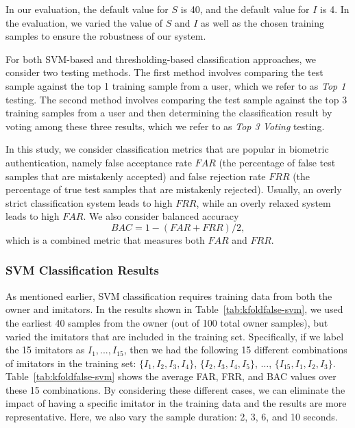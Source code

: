 In our evaluation, the default value for $S$ is 40, and the default value for 
$I$ is 4. In the evaluation, we varied the value of $S$ and $I$ as well as the 
chosen training samples to ensure the robustness of our system.

For both SVM-based and thresholding-based classification approaches, we consider two testing methods. The first method involves comparing the test sample against the top 1 training sample from a user, which we refer to as \emph{Top 1} testing. The second method involves comparing the test sample against the top 3 training samples from a user and then determining the classification result by voting among these three results, which we refer to as \emph{Top 3 Voting} testing.

In this study, we consider classification metrics that are popular in biometric authentication, namely false acceptance rate $FAR$ (the percentage of false test samples that are mistakenly accepted) and false rejection rate $FRR$ (the percentage of true test samples that are mistakenly rejected). Usually, an overly strict classification system leads to high $FRR$, while an overly relaxed system leads to high $FAR$. We also consider balanced accuracy $$BAC = 1 - (FAR+FRR)/2,$$ which is a combined metric that measures both $FAR$ and $FRR$.


\iffalse
\subsubsection{SVM Classification Results}

As mentioned earlier, SVM classification requires training data from both the owner and imitators. In the results shown in Table~\ref{tab:kfoldfalse-svm}, we used the earliest 40 samples from the owner (out of 100 total owner samples), but varied the imitators that are included in the training set. Specifically, if we label the 15 imitators as $I_1, ..., I_{15}$, then we had the following 15 different combinations of imitators in the training set: $\{I_1, I_2, I_3, I_4\}$, $\{I_2, I_3, I_4, I_5\}$, $\dots$, $\{I_{15}, I_1, I_2, I_3\}$.  Table~\ref{tab:kfoldfalse-svm} shows the average FAR, FRR, and BAC values over these 15 combinations. By considering these different cases, we can eliminate the impact of having a specific imitator in the training data and the results are more representative. Here, we also vary the sample duration: 2, 3, 6, and 10 seconds.

